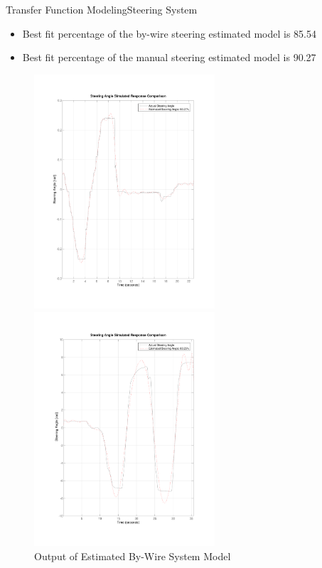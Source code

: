 \documentclass{beamer}
\begin{document}
\begin{frame}{Transfer Function Modeling}{Steering System}
	\begin{block}{}
 \begin{itemize}
	\item Best fit percentage of the by-wire steering estimated model is 85.54
	\item Best fit percentage of the manual steering estimated model is 90.27
 \end{itemize}
 \begin{figure}
    \centering
    \begin{minipage}{0.45\textwidth}
        \centering
        \includegraphics[width=0.6\textwidth]{figs/img/byWireSteeringTransferFunctionModel} %
        \caption{Output of Estimated By-Wire System Model}
        \label{fig:byWireSteerModel}
    \end{minipage}\hfill
    \begin{minipage}{0.45\textwidth}
        \centering
        \includegraphics[width=0.6\textwidth]{figs/img/manualSteeringTransferFunctionModel} %

\end{minipage}
\end{figure}
\end{block}
\end{frame}
\end{document}
